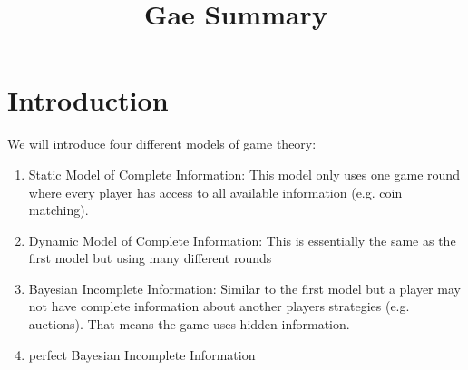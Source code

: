 \documentclass[a4paper, 12pt]{article}
\theoremstyle{plain}
\theoremstyle{definition}
\theoremstyle{lemma}
\theoremstyle{remark}
\theoremstyle{corollary}
\theoremstyle{example}
\begin{document}
	\begin{titlepage} 
		\title{Gae Summary}
		\clearpage\maketitle
		\thispagestyle{empty}
	\end{titlepage}
	\tableofcontents
	\newpage
	\section{Introduction}
	We will introduce four different models of game theory: \begin{enumerate}
		\item Static Model of Complete Information: This model only uses one game round where every player has access to all available information (e.g. coin matching).
		\item Dynamic Model of Complete Information: This is essentially the same as the first model but using many different rounds
		\item Bayesian Incomplete Information: Similar to the first model but a player may not have complete information about another players strategies (e.g. auctions). That means the game uses hidden information.
		\item perfect Bayesian Incomplete Information
	\end{enumerate}
\end{document}
